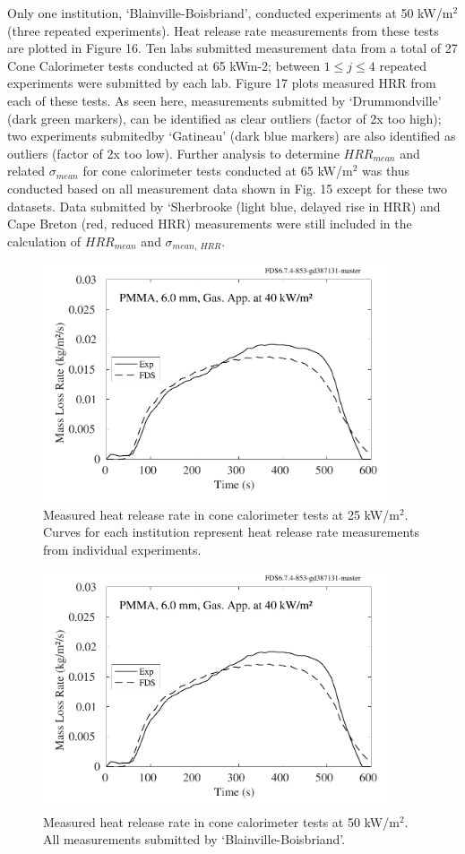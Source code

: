 \documentclass{book}
\begin{document}
Only one institution, ‘Blainville-Boisbriand’, conducted experiments at 50 kW/m$^2$ (three repeated experiments). Heat release rate measurements from these tests are plotted in Figure 16.
Ten labs submitted measurement data from a total of 27 Cone Calorimeter tests conducted at 65 kWm-2; between $1\le j\le4$ repeated experiments were submitted by each lab. Figure 17 plots measured HRR from each of these tests. As seen here, measurements submitted by ‘Drummondville’ (dark green markers), can be identified as clear outliers (factor of 2x too high); two experiments submitedby ‘Gatineau’ (dark blue markers) are also identified as outliers (factor of 2x too low). Further analysis to determine $HRR_{mean}$ and related $\sigma_{mean}$ for cone calorimeter tests conducted at 65 kW/m$^2$ was thus conducted based on all measurement data shown in Fig. 15 except for these two datasets. Data submitted by ‘Sherbrooke (light blue, delayed rise in HRR) and Cape Breton (red, reduced HRR) measurements were still included in the calculation of  $HRR_{mean}$ and $\sigma_{mean,\ HRR}$.

\begin{figure}
  \centering
  \includegraphics[width=4in]{SCRIPT_FIGURES/PMMA_40}
  \caption{Measured heat release rate in cone calorimeter tests at 25 kW/m$^2$. Curves for each institution represent heat release rate measurements from individual experiments.}
  \label{Fig_15}
\end{figure}

\begin{figure}
  \centering
  \includegraphics[width=4in]{SCRIPT_FIGURES/PMMA_40}
  \caption{Measured heat release rate in cone calorimeter tests at 50 kW/m$^2$. All measurements submitted by ‘Blainville-Boisbriand’.}
  \label{Fig_16}
\end{figure}
\end{document}
